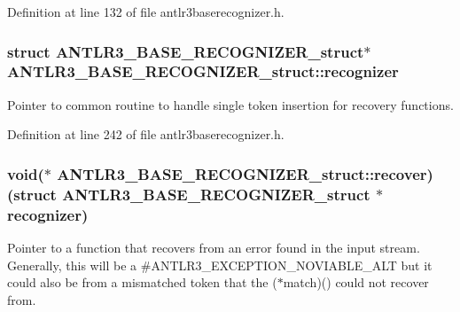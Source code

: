 Definition at line 132 of file antlr3baserecognizer.\-h.

\hypertarget{struct_a_n_t_l_r3___b_a_s_e___r_e_c_o_g_n_i_z_e_r__struct_aa7ab273aa44860cea6cd6e41528b57af}{
\subsubsection[{recognizer}]{\setlength{\rightskip}{0pt plus 5cm}struct {\bf A\-N\-T\-L\-R3\-\_\-\-B\-A\-S\-E\-\_\-\-R\-E\-C\-O\-G\-N\-I\-Z\-E\-R\-\_\-struct}$\ast$ A\-N\-T\-L\-R3\-\_\-\-B\-A\-S\-E\-\_\-\-R\-E\-C\-O\-G\-N\-I\-Z\-E\-R\-\_\-struct\-::recognizer}}\label{struct_a_n_t_l_r3___b_a_s_e___r_e_c_o_g_n_i_z_e_r__struct_aa7ab273aa44860cea6cd6e41528b57af}
Pointer to common routine to handle single token insertion for recovery functions. 

Definition at line 242 of file antlr3baserecognizer.\-h.

\hypertarget{struct_a_n_t_l_r3___b_a_s_e___r_e_c_o_g_n_i_z_e_r__struct_aed4f2b5b8c2d9c255e07bd32be9c3b88}{
\subsubsection[{recover}]{\setlength{\rightskip}{0pt plus 5cm}void($\ast$ A\-N\-T\-L\-R3\-\_\-\-B\-A\-S\-E\-\_\-\-R\-E\-C\-O\-G\-N\-I\-Z\-E\-R\-\_\-struct\-::recover)(struct {\bf A\-N\-T\-L\-R3\-\_\-\-B\-A\-S\-E\-\_\-\-R\-E\-C\-O\-G\-N\-I\-Z\-E\-R\-\_\-struct} $\ast${\bf recognizer})}}\label{struct_a_n_t_l_r3___b_a_s_e___r_e_c_o_g_n_i_z_e_r__struct_aed4f2b5b8c2d9c255e07bd32be9c3b88}
Pointer to a function that recovers from an error found in the input stream. Generally, this will be a \#\-A\-N\-T\-L\-R3\-\_\-\-E\-X\-C\-E\-P\-T\-I\-O\-N\-\_\-\-N\-O\-V\-I\-A\-B\-L\-E\-\_\-\-A\-L\-T but it could also be from a mismatched token that the ($\ast$match)() could not recover from. 

